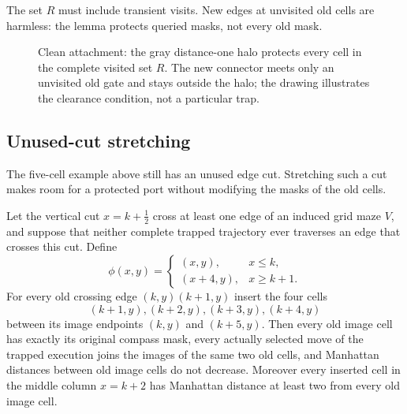 The set $R$ must include transient visits. New edges at unvisited old cells are
harmless: the lemma protects queried masks, not every old mask.

\begin{figure}[t]
\centering

\caption{Clean attachment: the gray distance-one halo protects every cell in the complete
visited set $R$. The new connector meets only an unvisited old gate and stays outside
the halo; the drawing illustrates the clearance condition, not a particular trap.}
\label{fig:clean-attachment}
\end{figure}

\subsection{Unused-cut stretching}
\label{subsubsec:unused-cut-stretching}

The five-cell example above still has an unused edge cut.  Stretching such a cut makes
room for a protected port without modifying the masks of the old cells.

\begin{lemma}
\label{lem:unused-cut-stretching}
Let the vertical cut $x=k+\tfrac12$ cross at least one edge of an induced grid maze
$V$, and suppose that neither complete trapped trajectory ever traverses an edge that
crosses this cut.  Define
\[
\phi(x,y)=
\begin{cases}
(x,y),&x\le k,\\
(x+4,y),&x\ge k+1.
\end{cases}
\]
For every old crossing edge $(k,y)(k+1,y)$ insert the four cells
\[
 (k+1,y),(k+2,y),(k+3,y),(k+4,y)
\]
between its image endpoints $(k,y)$ and $(k+5,y)$.  Then every old image cell has
exactly its original compass mask, every actually selected move of the trapped
execution joins the images of the same two old cells, and Manhattan distances between
old image cells do not decrease.  Moreover every inserted cell in the middle column
$x=k+2$ has Manhattan distance at least two from every old image cell.
\end{lemma}


